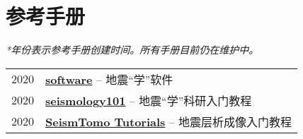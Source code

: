 \section*{参考手册}

\textit{*年份表示参考手册创建时间。所有手册目前仍在维护中。}

\begin{tabular}{p{} p{}}
2020 &	\textbf{\href{https://seismo-learn.org/software/}{software}} -- 地震“学”软件 \\
2020 &	\textbf{\href{https://seismo-learn.org/seismology101/}{seismology101}} -- 地震“学”科研入门教程 \\
2020 &  \textbf{\href{https://migg-ntu.github.io/SeisTomo_Tutorials/}{SeismTomo Tutorials}} -- 地震层析成像入门教程 \\
\end{tabular}
